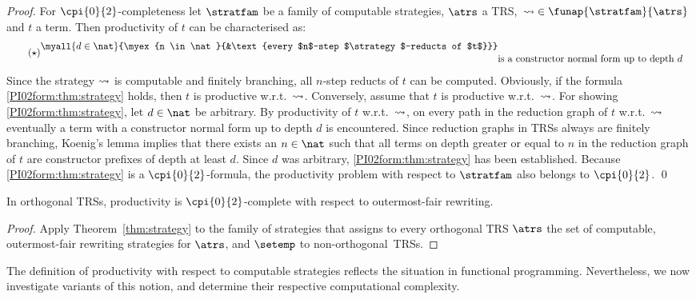 \begin{proof}
{  For $\cpi{0}{2}$-completeness let $\stratfam$ be a family of computable strategies,
  $\atrs$ a TRS,~${\strategy} \in \funap{\stratfam}{\atrs}$ and $t$ a term. 
  Then productivity of $t$ can be characterised as:
\begin{equation}
    \tag{$\star$}\label{PI02form:thm:strategy}
\begin{aligned}
      \myall{d \in \nat}{\myex{n \in \nat}{&\text{every $n$-step $\strategy$-reducts of $t$}}}\\[-0.5ex]
      &\text{is a constructor normal form up to depth $d$}
\end{aligned}
\end{equation}
Since the strategy ${\leadsto}$ is computable and finitely branching, 
  all $n$-step reducts of $t$ can be computed.
  Obviously, if the formula \eqref{PI02form:thm:strategy}
  holds, then $t$ is productive w.r.t.\ $\leadsto$.
  Conversely, assume that $t$ is productive w.r.t.\ $\leadsto$.
  For showing \eqref{PI02form:thm:strategy}, let $d\in\nat$ be arbitrary.
  By productivity of $t$ w.r.t.\ $\leadsto$, on every path in the reduction 
  graph of $t$ w.r.t.\ $\leadsto$ eventually a term with a constructor normal
  form up to depth $d$ is encountered. Since reduction graphs in TRSs
  always are finitely branching, Koenig's lemma implies that there 
  exists an $n\in\nat$ such that all terms on depth greater or equal to $n$ 
  in the reduction graph of $t$ are constructor prefixes of depth at least $d$. 
  Since $d$ was arbitrary, \eqref{PI02form:thm:strategy} has been established. 
Because \eqref{PI02form:thm:strategy} is a $\cpi{0}{2}$-formula, 
  the productivity problem with respect to $\stratfam$
  also belongs to $\cpi{0}{2}$.
\qed
}\end{proof}


\begin{corollary}
  In orthogonal TRSs, productivity is $\cpi{0}{2}$-complete 
  with respect to outermost-fair rewriting. 
\end{corollary}
\begin{proof}
  Apply Theorem~\ref{thm:strategy} to the family of strategies 
  that assigns to every orthogonal TRS $\atrs$
  the set of computable, outermost-fair rewriting strategies for $\atrs$,
  and $\setemp$ to non-orthogonal~TRSs.
\end{proof}

The definition of productivity with respect to computable strategies
reflects the situation in functional programming.
Nevertheless, we now investigate variants of this notion, and determine
their respective computational complexity.



